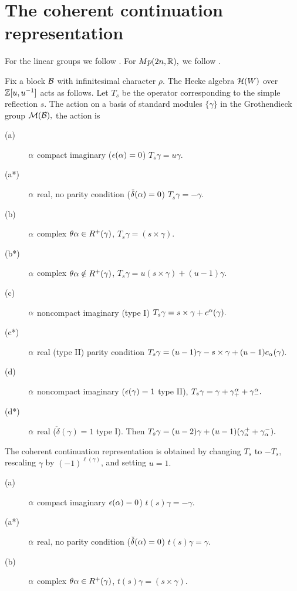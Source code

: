 \documentclass[11pt ,reqno]{amsart}
\begin{document}
  


\section{The coherent continuation representation}\label{2}
For the linear groups we follow \cite{V4}. For $Mp(2n,{\mathbb R}),$ we
follow \cite{RT}.

\begin{definition}
Fix a block ${\mathcal B}$ with infinitesimal character
$\rho.$ The Hecke algebra ${\mathcal H}(W)$ over ${\mathbb Z}[u,u^{-1}]$ acts as
follows. Let $T_s$ be the operator corresponding to the simple
reflection $s.$ The action on a basis of standard modules $\{\gamma\}$
in the Grothendieck group ${\mathcal M}({\mathcal B}),$ the action is 
\begin{description}
\item[(a) ] ${\alpha}$ compact imaginary (${\epsilon}({\alpha})=0$)
  $T_s\gamma=u\gamma.$
\item[(a*) ] ${\alpha}$ real, no parity condition ($\check{\delta}({\alpha})=0$)
  $T_s\gamma=-\gamma$.
\item[(b) ] ${\alpha}$ complex $\theta{\alpha}\in R^+(\gamma)$,
$T_s\gamma=(s\times\gamma)$.
\item[(b*) ] ${\alpha}$ complex $\theta{\alpha}\notin R^+(\gamma)$,
$T_s\gamma=u(s\times\gamma) +(u-1)\gamma$.
\item[(c) ] ${\alpha}$ noncompact imaginary (type I)
  $T_s\gamma=s\times\gamma+ c^{\alpha}(\gamma).$
\item[(c*) ] ${\alpha}$ real  (type II) parity condition
  $T_s\gamma=(u-1)\gamma-s\times\gamma+ (u-1)c_{\alpha}(\gamma).$
\item[(d) ] ${\alpha}$ noncompact imaginary (${\epsilon}(\gamma)=1$ type II),
$T_s\gamma=\gamma +\gamma^{\alpha}_++\gamma^{\alpha}_-.$ 
\item[(d*) ] ${\alpha}$ real ($\check\delta(\gamma)=1$ type I). Then
  $T_s\gamma=(u-2)\gamma +(u-1)(\gamma_{\alpha}^++\gamma_{\alpha}^-).$
\end{description}
The coherent continuation representation is obtained by changing $T_s$
to $-T_s,$ rescaling $\gamma$ by $(-1)^{\ell(\gamma)}$, and setting  $u=1.$ 
\begin{description}
\item[(a) ] ${\alpha}$ compact imaginary ${\epsilon}({\alpha})=0$)
  $t(s)\gamma=-\gamma.$
\item[(a*) ] ${\alpha}$ real, no parity condition ($\check{\delta}({\alpha})=0$)
  $t(s)\gamma=\gamma$.
\item[(b) ] ${\alpha}$ complex $\theta{\alpha}\in R^+(\gamma)$,
$t(s)\gamma=(s\times\gamma)$.

\end{description}
\end{definition}
\end{document}
